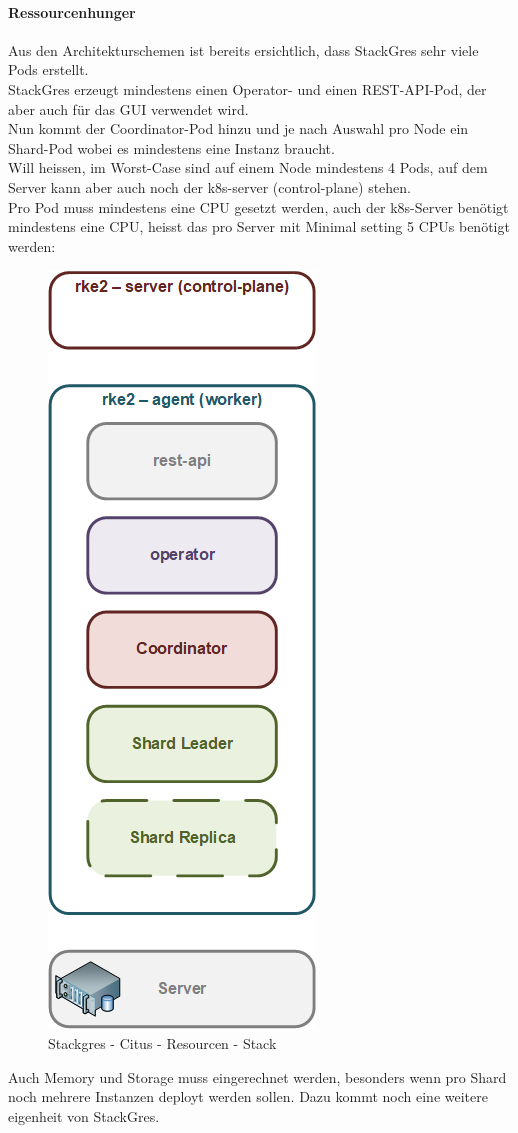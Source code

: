 \begin{flushleft}
    \paragraph{Ressourcenhunger}
    Aus den Architekturschemen ist bereits ersichtlich, dass StackGres sehr viele Pods erstellt.\\
    StackGres erzeugt mindestens einen Operator- und einen REST-API-Pod, der aber auch für das GUI verwendet wird.\\
    Nun kommt der Coordinator-Pod hinzu und je nach Auswahl pro Node ein Shard-Pod wobei es mindestens eine Instanz braucht.\\
    Will heissen, im Worst-Case sind auf einem Node mindestens 4 Pods, auf dem Server kann aber auch noch der k8s-server (control-plane) stehen.\\
    Pro Pod muss mindestens eine CPU gesetzt werden, auch der k8s-Server benötigt mindestens eine CPU, heisst das pro Server mit Minimal setting 5 CPUs benötigt werden:
    \begin{figure}[H]
        \centering
        \includegraphics[width=0.2\linewidth]{source/implementation/evaluation/postgresql_ha_solutions/stackgres/stackgres_citus_architecture_resource_stack}
        \caption{Stackgres - Citus - Resourcen - Stack}
        \label{fig:stackgres_citus_architecture_resource_stack}
    \end{figure}
    Auch Memory und Storage muss eingerechnet werden, besonders wenn pro Shard noch mehrere Instanzen deployt werden sollen.
    Dazu kommt noch eine weitere eigenheit von StackGres.
\end{flushleft}

